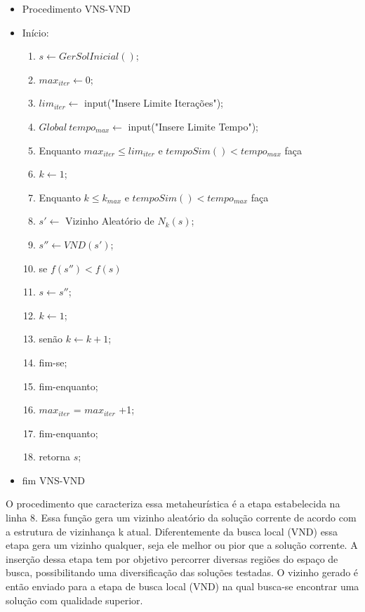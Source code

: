 \documentclass[12pt]{article}
\begin{document}
\begin{itemize}
	\item Procedimento VNS-VND 
	\item Início:
	\begin{enumerate}
		\item $s \leftarrow GerSolInicial()$; 
		\item $max_{iter} \leftarrow 0$;
		\item $lim_{iter} \leftarrow$ input("Insere Limite Iterações");
		\item $Global~tempo_{max} \leftarrow$ input("Insere Limite Tempo");
		\item Enquanto $max_{iter} \leq lim_{iter}$ e $tempoSim() < tempo_{max}$   faça
		\item $k \leftarrow 1$;
		\item Enquanto $k \leq k_{max}$ e $tempoSim() < tempo_{max}$ faça
		\item \quad $s'\leftarrow$ Vizinho Aleatório de $N_k(s)$;
		\item \quad $s'' \leftarrow VND(s')$; 
		\item \quad se $f(s'') < f(s)$
		\item \qquad  $s \leftarrow s''$;
		\item \qquad  $k \leftarrow 1$;
		\item \quad senão $k \leftarrow k + 1$;
		\item \quad fim-se;
		\item fim-enquanto;
		\item  $max_{iter}$ = $max_{iter}$ +1;
		\item fim-enquanto;
		\item retorna $s$;
	\end{enumerate}	
	\item fim VNS-VND
\end{itemize}

O procedimento que caracteriza essa metaheurística é a etapa estabelecida na linha 8. Essa função gera um vizinho aleatório da solução corrente de acordo com a estrutura de vizinhança k atual. Diferentemente da busca local (VND) essa etapa gera um vizinho qualquer, seja ele melhor ou pior que a solução corrente. A inserção dessa etapa tem por objetivo percorrer diversas regiões do espaço de busca, possibilitando uma diversificação das soluções testadas. O vizinho gerado é então enviado para a etapa de busca local (VND) na qual busca-se encontrar uma solução com qualidade superior.
\end{document}

